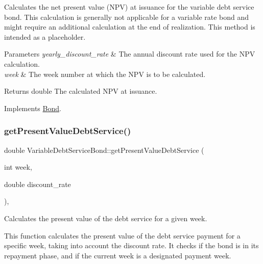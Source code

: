 Calculates the net present value (N\+PV) at issuance for the variable debt service bond. This calculation is generally not applicable for a variable rate bond and might require an additional calculation at the end of realization. This method is intended as a placeholder. 


\begin{DoxyParams}{Parameters}
{\em yearly\+\_\+discount\+\_\+rate} & The annual discount rate used for the N\+PV calculation. \\
\hline
{\em week} & The week number at which the N\+PV is to be calculated.\\
\hline
\end{DoxyParams}
\begin{DoxyReturn}{Returns}
double The calculated N\+PV at issuance. 
\end{DoxyReturn}


Implements \mbox{\hyperlink{classBond_a5997278813deb16aa5d01bbca8ecc7b2}{Bond}}.

\mbox{\label{classVariableDebtServiceBond_aa5ad4fcc7c65154105388b332ae98198}} 
\subsubsection{\texorpdfstring{get\+Present\+Value\+Debt\+Service()}{getPresentValueDebtService()}}
{\footnotesize\ttfamily double Variable\+Debt\+Service\+Bond\+::get\+Present\+Value\+Debt\+Service (\begin{DoxyParamCaption}\item[{int}]{week,  }\item[{double}]{discount\+\_\+rate }\end{DoxyParamCaption})\hspace{0.3cm}{\ttfamily [override]}, {\ttfamily [virtual]}}



Calculates the present value of the debt service for a given week. 

This function calculates the present value of the debt service payment for a specific week, taking into account the discount rate. It checks if the bond is in its repayment phase, and if the current week is a designated payment week.


